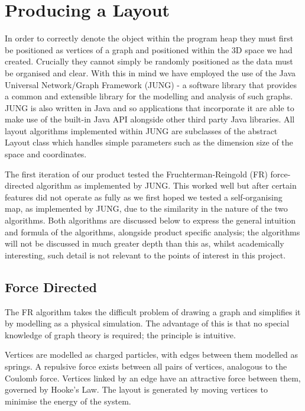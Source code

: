 \documentclass[11pt, a4paper]{report}
\begin{document}
\section{Producing a Layout}

In order to correctly denote the object within the program heap they must first be positioned as vertices of a graph and positioned within the 3D space we had created. Crucially they cannot simply be randomly positioned as the data must be organised and clear. With this in mind we have employed the use of the Java Universal Network/Graph Framework (JUNG) - a software library that provides a common and extensible library for the modelling and analysis of such graphs. JUNG is also written in Java and so applications that incorporate it are able to make use of the built-in Java API alongside other third party Java libraries. All layout algorithms implemented within JUNG are subclasses of the abstract Layout class which handles simple parameters such as the dimension size of the space and coordinates.

The first iteration of our product tested the Fruchterman-Reingold (FR) force-directed algorithm as implemented by JUNG. This worked well but after certain features did not operate as fully as we first hoped we tested a self-organising map, as implemented by JUNG, due to the similarity in the nature of the two algorithms. Both algorithms are discussed below to express the general intuition and formula of the algorithms, alongside product specific analysis; the algorithms will not be discussed in much greater depth than this as, whilst academically interesting, such detail is not relevant to the points of interest in this project.

\subsection{Force Directed}

The FR algorithm takes the difficult problem of drawing a graph and simplifies it by modelling as a physical simulation. The advantage of this is that no special knowledge of graph theory is required; the principle is intuitive.

Vertices are modelled as charged particles, with edges between them modelled as springs. A repulsive force exists between all pairs of vertices, analogous to the Coulomb force. Vertices linked by an edge have an attractive force between them, governed by Hooke’s Law. The layout is generated by moving vertices to minimise the energy of the system.
\end{document}
